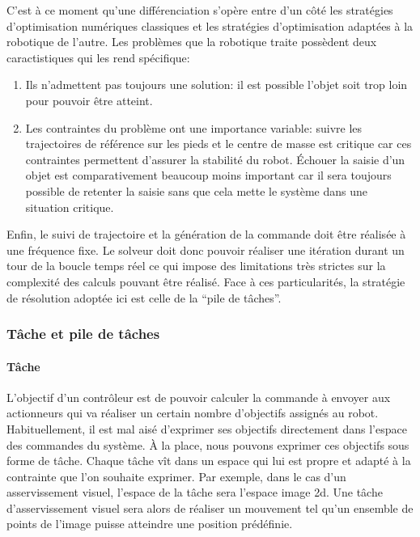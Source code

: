 C'est à ce moment qu'une différenciation s'opère entre d'un côté les
stratégies d'optimisation numériques classiques et les stratégies
d'optimisation adaptées à la robotique de l'autre. Les problèmes que
la robotique traite possèdent deux caractistiques qui les rend
spécifique:
\begin{enumerate}
\item Ils n'admettent pas toujours une solution: il est possible
  l'objet soit trop loin pour pouvoir être atteint.
\item Les contraintes du problème ont une importance variable: suivre
  les trajectoires de référence sur les pieds et le centre de masse
  est critique car ces contraintes permettent d'assurer la stabilité
  du robot. Échouer la saisie d'un objet est comparativement beaucoup
  moins important car il sera toujours possible de retenter la saisie
  sans que cela mette le système dans une situation critique.
\end{enumerate}

Enfin, le suivi de trajectoire et la génération de la commande doit
être réalisée à une fréquence fixe. Le solveur doit donc pouvoir
réaliser une itération durant un tour de la boucle temps réel ce qui
impose des limitations très strictes sur la complexité des calculs
pouvant être réalisé. Face à ces particularités, la stratégie de
résolution adoptée ici est celle de la ``pile de tâches''.


\subsubsection{Tâche et pile de tâches}

\paragraph{Tâche}

L'objectif d'un contrôleur est de pouvoir calculer la commande à
envoyer aux actionneurs qui va réaliser un certain nombre d'objectifs
assignés au robot. Habituellement, il est mal aisé d'exprimer ses
objectifs directement dans l'espace des commandes du système. À la
place, nous pouvons exprimer ces objectifs sous forme de tâche. Chaque
tâche vît dans un espace qui lui est propre et adapté à la contrainte
que l'on souhaite exprimer. Par exemple, dans le cas d'un
asservissement visuel, l'espace de la tâche sera l'espace image
2d. Une tâche d'asservissement visuel sera alors de réaliser un
mouvement tel qu'un ensemble de points de l'image puisse atteindre une
position prédéfinie.

